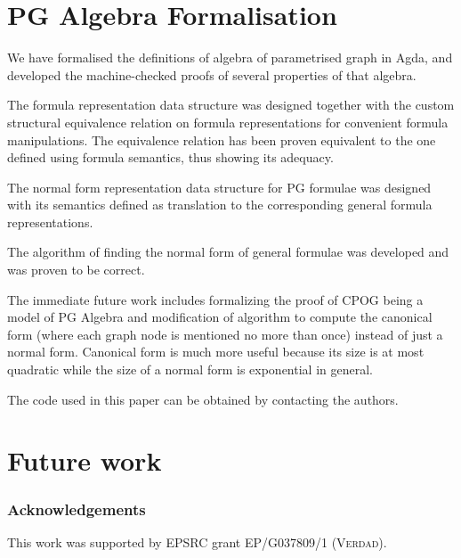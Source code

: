\section{PG Algebra Formalisation}
We have formalised the definitions of algebra of parametrised graph in Agda, and developed the machine-checked proofs of several properties of that algebra.

The formula representation data structure was designed together with the custom structural equivalence relation on formula representations for convenient formula manipulations. The equivalence relation has been proven equivalent to the one defined using formula semantics, thus showing its adequacy.

The normal form representation data structure for PG formulae was designed with its semantics defined as translation to the corresponding general formula representations.

The algorithm of finding the normal form of general formulae was developed and was proven to be correct.

The immediate future work includes formalizing the proof of CPOG being a model of PG Algebra and modification of algorithm to compute the canonical form (where each graph node is mentioned no more than once) instead of just a normal form. Canonical form is much more useful because its size is at most quadratic while the size of a normal form is exponential in general.

The code used in this paper can be obtained by contacting the authors.

\section{Future work}

\subsubsection*{Acknowledgements}

This work was supported by EPSRC grant EP/G037809/1
(\textsc{Verdad}).
